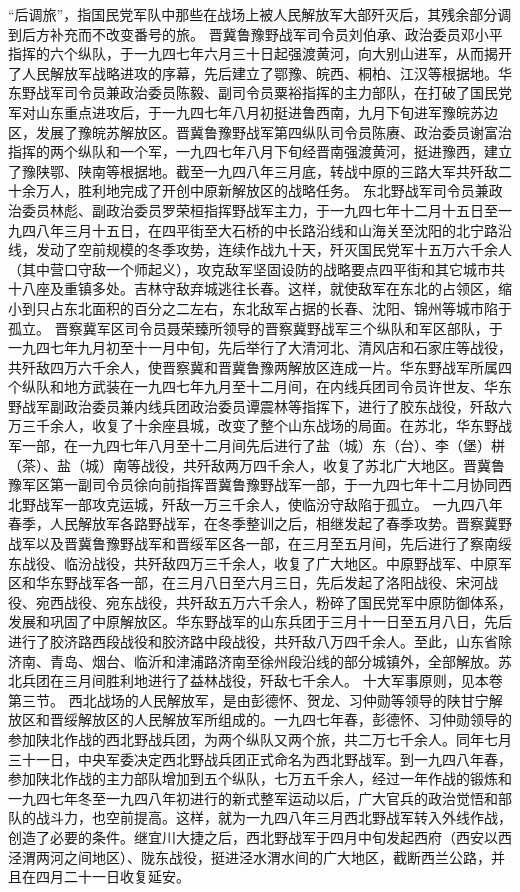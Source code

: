 \begin{maonote}
“后调旅”，指国民党军队中那些在战场上被人民解放军大部歼灭后，其残余部分调到后方补充而不改变番号的旅。
晋冀鲁豫野战军司令员刘伯承、政治委员邓小平指挥的六个纵队，于一九四七年六月三十日起强渡黄河，向大别山进军，从而揭开了人民解放军战略进攻的序幕，先后建立了鄂豫、皖西、桐柏、江汉等根据地。华东野战军司令员兼政治委员陈毅、副司令员粟裕指挥的主力部队，在打破了国民党军对山东重点进攻后，于一九四七年八月初挺进鲁西南，九月下旬进军豫皖苏边区，发展了豫皖苏解放区。晋冀鲁豫野战军第四纵队司令员陈赓、政治委员谢富治指挥的两个纵队和一个军，一九四七年八月下旬经晋南强渡黄河，挺进豫西，建立了豫陕鄂、陕南等根据地。截至一九四八年三月底，转战中原的三路大军共歼敌二十余万人，胜利地完成了开创中原新解放区的战略任务。
东北野战军司令员兼政治委员林彪、副政治委员罗荣桓指挥野战军主力，于一九四七年十二月十五日至一九四八年三月十五日，在四平街至大石桥的中长路沿线和山海关至沈阳的北宁路沿线，发动了空前规模的冬季攻势，连续作战九十天，歼灭国民党军十五万六千余人（其中营口守敌一个师起义），攻克敌军坚固设防的战略要点四平街和其它城市共十八座及重镇多处。吉林守敌弃城逃往长春。这样，就使敌军在东北的占领区，缩小到只占东北面积的百分之二左右，东北敌军占据的长春、沈阳、锦州等城市陷于孤立。
晋察冀军区司令员聂荣臻所领导的晋察冀野战军三个纵队和军区部队，于一九四七年九月初至十一月中旬，先后举行了大清河北、清风店和石家庄等战役，共歼敌四万六千余人，使晋察冀和晋冀鲁豫两解放区连成一片。华东野战军所属四个纵队和地方武装在一九四七年九月至十二月间，在内线兵团司令员许世友、华东野战军副政治委员兼内线兵团政治委员谭震林等指挥下，进行了胶东战役，歼敌六万三千余人，收复了十余座县城，改变了整个山东战场的局面。在苏北，华东野战军一部，在一九四七年八月至十二月间先后进行了盐（城）东（台）、李（堡）栟（茶）、盐（城）南等战役，共歼敌两万四千余人，收复了苏北广大地区。晋冀鲁豫军区第一副司令员徐向前指挥晋冀鲁豫野战军一部，于一九四七年十二月协同西北野战军一部攻克运城，歼敌一万三千余人，使临汾守敌陷于孤立。
一九四八年春季，人民解放军各路野战军，在冬季整训之后，相继发起了春季攻势。晋察冀野战军以及晋冀鲁豫野战军和晋绥军区各一部，在三月至五月间，先后进行了察南绥东战役、临汾战役，共歼敌四万三千余人，收复了广大地区。中原野战军、中原军区和华东野战军各一部，在三月八日至六月三日，先后发起了洛阳战役、宋河战役、宛西战役、宛东战役，共歼敌五万六千余人，粉碎了国民党军中原防御体系，发展和巩固了中原解放区。华东野战军的山东兵团于三月十一日至五月八日，先后进行了胶济路西段战役和胶济路中段战役，共歼敌八万四千余人。至此，山东省除济南、青岛、烟台、临沂和津浦路济南至徐州段沿线的部分城镇外，全部解放。苏北兵团在三月间胜利地进行了益林战役，歼敌七千余人。
十大军事原则，见本卷第三节。
西北战场的人民解放军，是由彭德怀、贺龙、习仲勋等领导的陕甘宁解放区和晋绥解放区的人民解放军所组成的。一九四七年春，彭德怀、习仲勋领导的参加陕北作战的西北野战兵团，为两个纵队又两个旅，共二万七千余人。同年七月三十一日，中央军委决定西北野战兵团正式命名为西北野战军。到一九四八年春，参加陕北作战的主力部队增加到五个纵队，七万五千余人，经过一年作战的锻炼和一九四七年冬至一九四八年初进行的新式整军运动以后，广大官兵的政治觉悟和部队的战斗力，也空前提高。这样，就为一九四八年三月西北野战军转入外线作战，创造了必要的条件。继宜川大捷之后，西北野战军于四月中旬发起西府（西安以西泾渭两河之间地区）、陇东战役，挺进泾水渭水间的广大地区，截断西兰公路，并且在四月二十一日收复延安。
\end{maonote}
